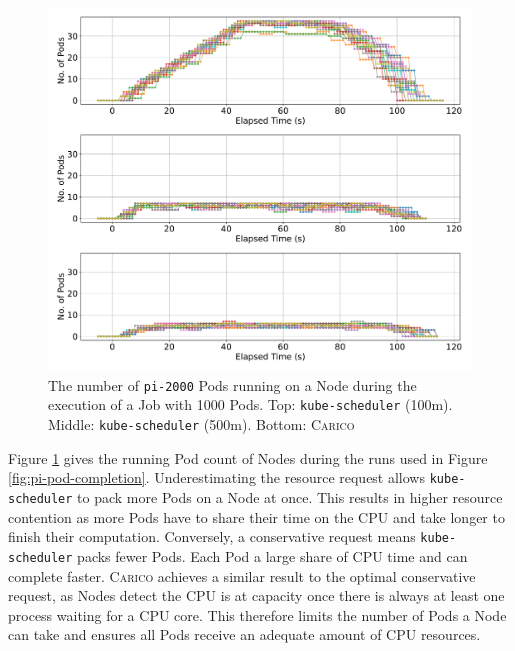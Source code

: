 \begin{figure}[ht!]
    \centering
    \includegraphics[width=\textwidth]{images/pi-running-pods.pdf}
    \caption{The number of \texttt{pi-2000} Pods running on a Node during the
    execution of a Job with 1000 Pods. Top: \texttt{kube-scheduler} (100m).
    Middle: \texttt{kube-scheduler} (500m). Bottom: \textsc{Carico}}
    \label{fig:pi-2000-1000x-pod-running}
\end{figure}

Figure \ref{fig:pi-2000-1000x-pod-running} gives the running Pod count of Nodes
during the runs used in Figure \ref{fig:pi-pod-completion}. Underestimating the
resource request allows \texttt{kube-scheduler} to pack more Pods on a Node at
once. This results in higher resource contention as more Pods have to share
their time on the CPU and take longer to finish their computation. Conversely,
a conservative request means \texttt{kube-scheduler} packs
fewer Pods. Each Pod a large share of CPU time and can complete faster.
\textsc{Carico} achieves a similar result to the optimal conservative request,
as Nodes detect the CPU is at capacity once there is always at least one process
waiting for a CPU core. This therefore limits the number of Pods a Node can take
and ensures all Pods receive an adequate amount of CPU resources.

